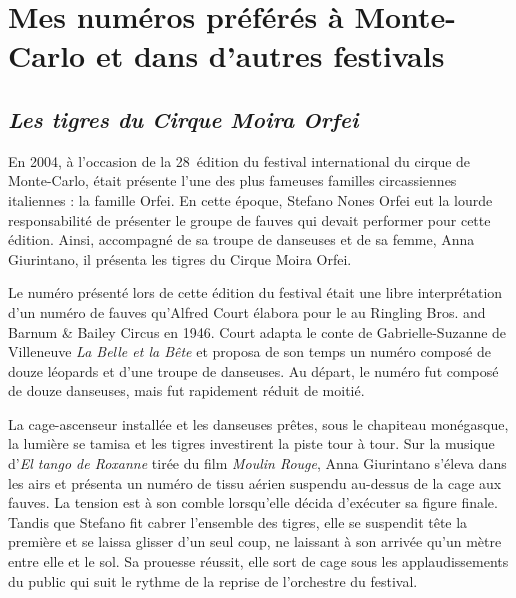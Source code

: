 \chapter{Mes numéros préférés à Monte-Carlo et dans d’autres festivals}

\section*{\textit{Les tigres du Cirque Moira Orfei}}
{}

En 2004, à l’occasion de la 28\ieme~édition du festival international du cirque de Monte-Carlo, était présente l’une des plus fameuses familles circassiennes italiennes : la famille Orfei. En cette époque, Stefano Nones Orfei eut la lourde responsabilité de présenter le groupe de fauves qui devait performer pour cette édition. Ainsi, accompagné de sa troupe de danseuses et de sa femme, Anna Giurintano, il présenta les tigres du Cirque Moira Orfei.

Le numéro présenté lors de cette édition du festival était une libre interprétation d’un numéro de fauves qu’Alfred Court élabora pour le au Ringling Bros. and Barnum \& Bailey Circus en 1946. Court adapta le conte de Gabrielle-Suzanne de Villeneuve \textit{La Belle et la Bête} et proposa de son temps un numéro composé de douze léopards et d’une troupe de danseuses. Au départ, le numéro fut composé de douze danseuses, mais fut rapidement réduit de moitié.

La cage-ascenseur installée et les danseuses prêtes, sous le chapiteau monégasque, la lumière se tamisa et les tigres investirent la piste tour à tour. Sur la musique d’\textit{El tango de Roxanne} tirée du film \textit{Moulin Rouge}, Anna Giurintano s’éleva dans les airs et présenta un numéro de tissu aérien suspendu au-dessus de la cage aux fauves. La tension est à son comble lorsqu’elle décida d’exécuter sa figure finale. Tandis que Stefano fit cabrer l’ensemble des tigres, elle se suspendit tête la première et se laissa glisser d’un seul coup, ne laissant à son arrivée qu’un mètre entre elle et le sol. Sa prouesse réussit, elle sort de cage sous les applaudissements du public qui suit le rythme de la reprise de l’orchestre du festival.

